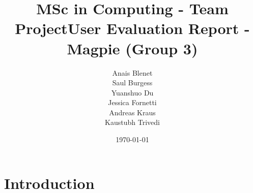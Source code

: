\documentclass{report}
\begin{document}
\title{MSc in Computing - Team Project}
\title{User Evaluation Report - Magpie (Group 3)}
\author{Anais Blenet\\Saul Burgess\\Yuanshuo Du\\Jessica Fornetti\\Andreas Kraus\\Kaustubh Trivedi}
\date{\today}

\renewcommand{\cfttoctitlefont}{\hfill\Huge\bfseries} %
\renewcommand{\cftaftertoctitle}{\hfill}

\maketitle %

\tableofcontents
\newpage

\chapter{Introduction}
\end{document}
